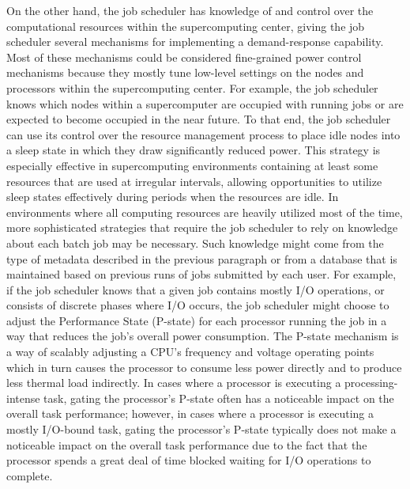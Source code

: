 On the other hand, the job scheduler has knowledge of and control over
the computational resources within the supercomputing center, giving
the job scheduler several mechanisms for implementing a
demand-response capability.  Most of these mechanisms could be
considered fine-grained power control mechanisms because they mostly
tune low-level settings on the nodes and processors within the
supercomputing center.  For example, the job scheduler knows which
nodes within a supercomputer are occupied with running jobs or are
expected to become occupied in the near future.  To that end, the job
scheduler can use its control over the resource management process to
place idle nodes into a sleep state in which they draw significantly
reduced power.  This strategy is especially effective in
supercomputing environments containing at least some resources that
are used at irregular intervals, allowing opportunities to utilize
sleep states effectively during periods when the resources are idle.
In environments where all computing resources are heavily utilized
most of the time, more sophisticated strategies that require the job
scheduler to rely on knowledge about each batch job may be necessary.
Such knowledge might come from the type of metadata described in the
previous paragraph or from a database that is maintained based on
previous runs of jobs submitted by each user.  For example, if the job
scheduler knows that a given job contains mostly I/O operations, or
consists of discrete phases where I/O occurs, the job scheduler might
choose to adjust the Performance State (P-state) for each processor
running the job in a way that reduces the job's overall power
consumption.  The P-state mechanism is a way of scalably adjusting a
CPU's frequency and voltage operating points which in turn causes the
processor to consume less power directly and to produce less thermal
load indirectly.  In cases where a processor is executing a
processing-intense task, gating the processor's P-state often has a
noticeable impact on the overall task performance; however, in cases
where a processor is executing a mostly I/O-bound task, gating the
processor's P-state typically does not make a noticeable impact on the
overall task performance due to the fact that the processor spends a
great deal of time blocked waiting for I/O operations to complete.

